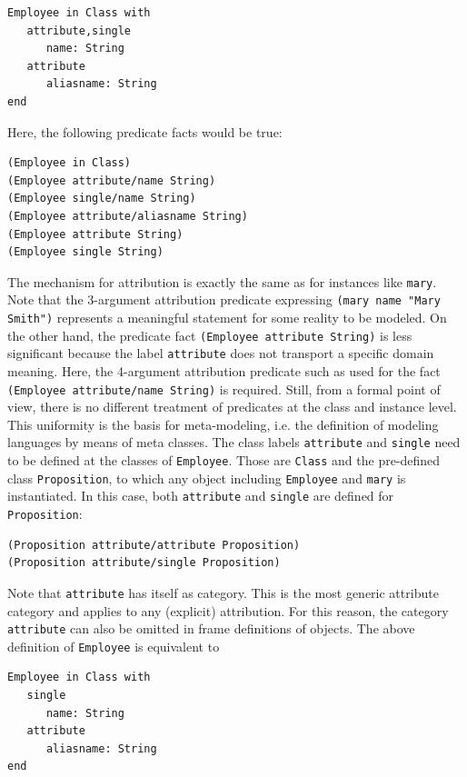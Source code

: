 \begin{verbatim}
Employee in Class with
   attribute,single
      name: String
   attribute
      aliasname: String
end
\end{verbatim}

Here, the following predicate facts would be true:

\begin{verbatim}
(Employee in Class)
(Employee attribute/name String)
(Employee single/name String)
(Employee attribute/aliasname String)
(Employee attribute String)
(Employee single String)
\end{verbatim}

The mechanism for attribution is exactly the same as for instances like {\tt mary}. 
Note that the 3-argument attribution predicate expressing {\tt (mary name "Mary Smith")} 
represents a meaningful statement for some reality to be modeled. 
On the other hand, the predicate fact {\tt (Employee attribute String)} is less significant
because the label {\tt attribute} does not transport a specific domain meaning. Here, the 4-argument
attribution predicate such as used for the fact {\tt (Employee attribute/name String)}
is required. Still, from a formal point of view, there is no different treatment of
predicates at the class and instance level.
This uniformity is the basis for meta-modeling, i.e. the definition of modeling
languages by means of meta classes.
The class labels
{\tt attribute} and {\tt single} need to be defined at the classes of {\tt Employee}. Those are
{\tt Class} and the pre-defined class {\tt Proposition}, to which any object including {\tt Employee}
and {\tt mary} is instantiated. In this case, both {\tt attribute} and {\tt single} are defined 
for {\tt Proposition}:

\begin{verbatim}
(Proposition attribute/attribute Proposition)
(Proposition attribute/single Proposition)
\end{verbatim}

Note that {\tt attribute} has itself as category. This is the most generic attribute category and
applies to any (explicit) attribution. For this reason, the category {\tt attribute} can also be
omitted in frame definitions of objects. The above definition of {\tt Employee} is equivalent to

\begin{verbatim}
Employee in Class with
   single
      name: String
   attribute
      aliasname: String
end
\end{verbatim}

